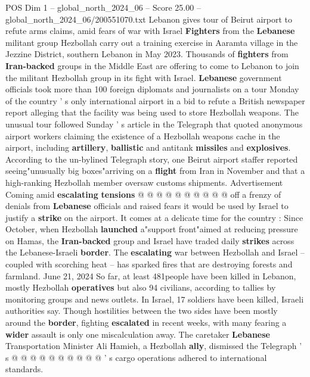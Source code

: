 \begin{textsample}{POS Dim 1 – global\_north\_2024\_06 – Score 25.00 – global\_north\_2024\_06/200551070.txt}  \label{ex:f1_pos_313}
Lebanon gives tour of Beirut airport to refute arms claims, amid fears of war with Israel \textbf{Fighters} from the \textbf{Lebanese} militant group Hezbollah carry out a training exercise in Aaramta village in the Jezzine District, southern Lebanon in May 2023.
Thousands of \textbf{fighters} from \textbf{Iran-backed} groups in the Middle East are offering to come to Lebanon to join the militant Hezbollah group in its fight with Israel. \textbf{Lebanese} government officials took more than 100 foreign diplomats and journalists on a tour Monday of the country ' s only international airport in a bid to refute a British newspaper report alleging that the facility was being used to store Hezbollah weapons.
The unusual tour followed Sunday ' s article in the Telegraph that quoted anonymous airport workers claiming the existence of a Hezbollah weapons cache in the airport, including \textbf{artillery}, \textbf{ballistic} and antitank \textbf{missiles} and \textbf{explosives}.
According to the un-bylined Telegraph story, one Beirut airport staffer reported seeing"unusually big boxes"arriving on a \textbf{flight} from Iran in November and that a high-ranking Hezbollah member oversaw customs shipments.
Advertisement Coming amid \textbf{escalating} \textbf{tensions} @ @ @ @ @ @ @ @ @ @ off a frenzy of denials from \textbf{Lebanese} officials and raised fears it would be used by Israel to justify a \textbf{strike} on the airport.
It comes at a delicate time for the country : Since October, when Hezbollah \textbf{launched} a"support front"aimed at reducing pressure on Hamas, the \textbf{Iran-backed} group and Israel have traded daily \textbf{strikes} across the Lebanese-Israeli \textbf{border}.
The \textbf{escalating} war between Hezbollah and Israel -- coupled with scorching heat -- has sparked fires that are destroying forests and farmland.
June 21, 2024 So far, at least 481people have been killed in Lebanon, mostly Hezbollah \textbf{operatives} but also 94 civilians, according to tallies by monitoring groups and news outlets.
In Israel, 17 soldiers have been killed, Israeli authorities say.
Though hostilities between the two sides have been mostly around the \textbf{border}, fighting \textbf{escalated} in recent weeks, with many fearing a \textbf{wider} assault is only one miscalculation away.
The caretaker \textbf{Lebanese} Transportation Minister Ali Hamieh, a Hezbollah \textbf{ally}, dismissed the Telegraph ' s @ @ @ @ @ @ @ @ @ @ ' s cargo operations adhered to international standards.

\end{textsample}

